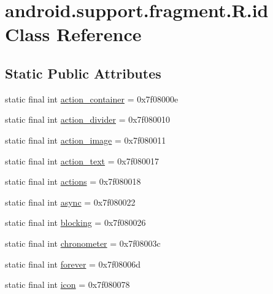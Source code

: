 \hypertarget{classandroid_1_1support_1_1fragment_1_1R_1_1id}{}\section{android.\+support.\+fragment.\+R.\+id Class Reference}
\label{classandroid_1_1support_1_1fragment_1_1R_1_1id}
\subsection*{Static Public Attributes}
\begin{DoxyCompactItemize}
\item 
static final int \mbox{\hyperlink{classandroid_1_1support_1_1fragment_1_1R_1_1id_ad4bec45cf9cff52d520e860a574aa226}{action\+\_\+container}} = 0x7f08000e
\item 
static final int \mbox{\hyperlink{classandroid_1_1support_1_1fragment_1_1R_1_1id_ad811bb6964dcc433ccc688817648d8be}{action\+\_\+divider}} = 0x7f080010
\item 
static final int \mbox{\hyperlink{classandroid_1_1support_1_1fragment_1_1R_1_1id_a135eef42157f8f706a6c74f8fcba6134}{action\+\_\+image}} = 0x7f080011
\item 
static final int \mbox{\hyperlink{classandroid_1_1support_1_1fragment_1_1R_1_1id_afbdd120fa0aabb9a6df0d71b036812c2}{action\+\_\+text}} = 0x7f080017
\item 
static final int \mbox{\hyperlink{classandroid_1_1support_1_1fragment_1_1R_1_1id_ae14cedff31dc8e6312a5676db60c9646}{actions}} = 0x7f080018
\item 
static final int \mbox{\hyperlink{classandroid_1_1support_1_1fragment_1_1R_1_1id_ae3f9c73e6d119f64fb24f8073b386d49}{async}} = 0x7f080022
\item 
static final int \mbox{\hyperlink{classandroid_1_1support_1_1fragment_1_1R_1_1id_ae4aa5f931fb8f34e17062e5788ea047d}{blocking}} = 0x7f080026
\item 
static final int \mbox{\hyperlink{classandroid_1_1support_1_1fragment_1_1R_1_1id_a4e681b3334ae6de2690be4150ee81814}{chronometer}} = 0x7f08003c
\item 
static final int \mbox{\hyperlink{classandroid_1_1support_1_1fragment_1_1R_1_1id_a66b5bab8e16306a04b94937007a15d13}{forever}} = 0x7f08006d
\item 
static final int \mbox{\hyperlink{classandroid_1_1support_1_1fragment_1_1R_1_1id_a5140967d824488b19b7e3ddeffbc0c6b}{icon}} = 0x7f080078
\item 

\end{DoxyCompactItemize}
